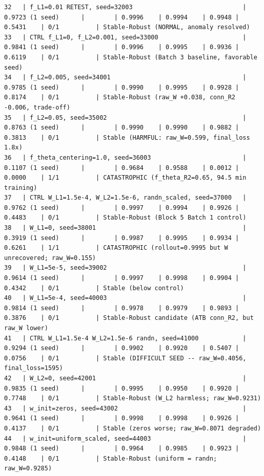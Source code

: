 \documentclass{article}
\begin{document}
\begin{tiny}
\begin{verbatim}
32   | f_L1=0.01 RETEST, seed=32003                              | 0.9723 (1 seed)      |        | 0.9996    | 0.9994    | 0.9948 | 0.5431    | 0/1          | Stable-Robust (NORMAL, anomaly resolved)
33   | CTRL f_L1=0, f_L2=0.001, seed=33000                       | 0.9841 (1 seed)      |        | 0.9996    | 0.9995    | 0.9936 | 0.6119    | 0/1          | Stable-Robust (Batch 3 baseline, favorable seed)
34   | f_L2=0.005, seed=34001                                    | 0.9785 (1 seed)      |        | 0.9990    | 0.9995    | 0.9928 | 0.8174    | 0/1          | Stable-Robust (raw_W +0.038, conn_R2 -0.006, trade-off)
35   | f_L2=0.05, seed=35002                                     | 0.8763 (1 seed)      |        | 0.9990    | 0.9990    | 0.9882 | 0.3813    | 0/1          | Stable (HARMFUL: raw_W=0.599, final_loss 1.8x)
36   | f_theta_centering=1.0, seed=36003                         | 0.1107 (1 seed)      |        | 0.9684    | 0.9588    | 0.0012 | 0.0000    | 1/1          | CATASTROPHIC (f_theta_R2=0.65, 94.5 min training)
37   | CTRL W_L1=1.5e-4, W_L2=1.5e-6, randn_scaled, seed=37000   | 0.9762 (1 seed)      |        | 0.9997    | 0.9994    | 0.9926 | 0.4483    | 0/1          | Stable-Robust (Block 5 Batch 1 control)
38   | W_L1=0, seed=38001                                        | 0.3919 (1 seed)      |        | 0.9987    | 0.9995    | 0.9934 | 0.6261    | 1/1          | CATASTROPHIC (rollout=0.9995 but W unrecovered; raw_W=0.155)
39   | W_L1=5e-5, seed=39002                                     | 0.9614 (1 seed)      |        | 0.9997    | 0.9998    | 0.9904 | 0.4342    | 0/1          | Stable (below control)
40   | W_L1=5e-4, seed=40003                                     | 0.9814 (1 seed)      |        | 0.9978    | 0.9979    | 0.9893 | 0.3876    | 0/1          | Stable-Robust candidate (ATB conn_R2, but raw_W lower)
41   | CTRL W_L1=1.5e-4 W_L2=1.5e-6 randn, seed=41000            | 0.9294 (1 seed)      |        | 0.9902    | 0.9920    | 0.5407 | 0.0756    | 0/1          | Stable (DIFFICULT SEED -- raw_W=0.4056, final_loss=1595)
42   | W_L2=0, seed=42001                                        | 0.9835 (1 seed)      |        | 0.9995    | 0.9950    | 0.9920 | 0.7748    | 0/1          | Stable-Robust (W_L2 harmless; raw_W=0.9231)
43   | w_init=zeros, seed=43002                                  | 0.9641 (1 seed)      |        | 0.9998    | 0.9998    | 0.9926 | 0.4137    | 0/1          | Stable (zeros worse; raw_W=0.8071 degraded)
44   | w_init=uniform_scaled, seed=44003                         | 0.9848 (1 seed)      |        | 0.9964    | 0.9985    | 0.9923 | 0.4148    | 0/1          | Stable-Robust (uniform = randn; raw_W=0.9285)

\end{verbatim}
\end{tiny}
\end{document}
